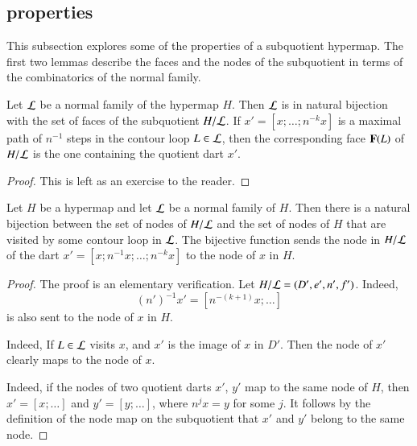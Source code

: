 \figWMWCTGH   %


\subsection{properties}

This subsection explores some of the properties of a subquotient hypermap.
The first two lemmas describe the faces and the nodes of the subquotient
in terms of the combinatorics of the normal family.

\begin{lemma}\label{lemma:subquotient-bijection}
  Let ${\cal L}$ be a normal family of the hypermap $H$.  Then ${\cal
    L}$ is in natural bijection with the set of faces of the subquotient
  $H/{\cal L}$.  If $x'=[x;\ldots;n^{-k}x]$ is a maximal path of
  $n^{-1}$ steps in the contour loop $L\in{\cal L}$, then the
  corresponding face ${\mathbf F}(L)$ of $H/{\cal L}$ is the
  one containing the quotient dart $x'$.
\end{lemma}
%

\begin{proof}  This is left as an exercise to the reader.
\end{proof}


\begin{lemma}\label{lemma:subquotient-node}
Let $H$ be a hypermap and let ${\cal L}$ be a normal family of $H$.
Then there is a natural bijection between  the set of nodes of
$H/{\cal L}$ and the set of nodes of $H$ that
are visited by some contour loop in ${\cal L}$.   
The bijective function sends the node in $H/{\cal L}$ of 
the dart $x' = [x;n^{-1} x;\ldots;n^{-k}x]$ to the node of $x$ in $H$.
\end{lemma}

\begin{proof}  The proof is an elementary verification.
Let $H/{\cal L} = (D',e',n',f')$.
  Indeed, 
 \[ 
(n')^{-1} x' = [n^{-(k+1)} x;\ldots]
\] 
 is also sent to the node of $x$ in $H$.

  Indeed,
If $L\in {\cal L}$ visits $x$,  and $x'$ is the image of $x$ in $D'$.
Then the node of $x'$ clearly maps to the node of $x$.  

  Indeed, if the nodes of
two quotient darts $x'$, $y'$ map to the same node of $H$, then
$x'=[x;\ldots]$ and $y'=[y;\ldots]$, where $n^j x = y$ for some $j$.
It follows by the definition of the node map on the subquotient that
$x'$ and $y'$ belong to the same node.
\end{proof}

